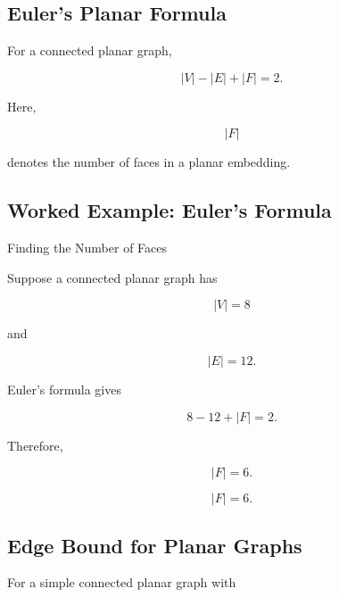 \subsection{Euler's Planar Formula}
\label{subsec:eulers-planar-formula}

\begin{theorem}
For a connected planar graph,

\[
\boxed{
|V|-|E|+|F|=2.
}
\]
\end{theorem}

Here,

\[
|F|
\]

denotes the number of faces in a planar embedding.

\subsection{Worked Example: Euler's Formula}
\label{subsec:worked-euler-planar}

\begin{workedexamplebox}{Finding the Number of Faces}

Suppose a connected planar graph has

\[
|V|=8
\]

and

\[
|E|=12.
\]

Euler's formula gives

\[
8-12+|F|=2.
\]

Therefore,

\[
|F|=6.
\]

\begin{answerbox}
\[
\boxed{
|F|=6.
}
\]
\end{answerbox}

\end{workedexamplebox}

\subsection{Edge Bound for Planar Graphs}
\label{subsec:planar-edge-bound}

For a simple connected planar graph with


